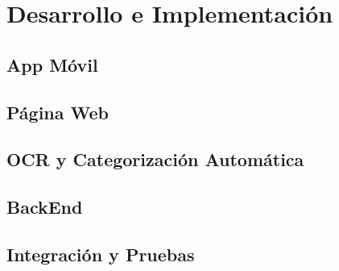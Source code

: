 \chapter{Desarrollo e Implementación}

\section{App Móvil}




\section{Página Web}

\section{OCR y Categorización Automática}

\section{BackEnd}

\section{Integración y Pruebas}

